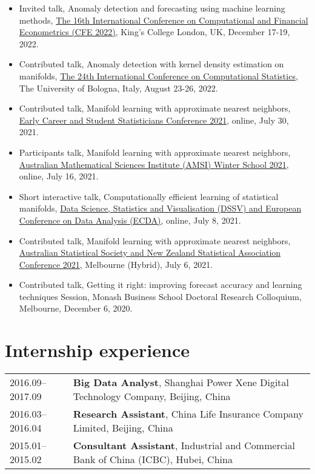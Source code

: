 \documentclass[10pt,a4paper,]{article}
\begin{document}
\begin{itemize}
\item
  Invited talk, Anomaly detection and forecasting using machine learning
  methods,
  \href{http://www.cfenetwork.org/CFE2022/index.php}{The 16th International Conference on Computational and Financial Econometrics (CFE 2022)},
  King's College London, UK, December 17-19, 2022.
\item
  Contributed talk, Anomaly detection with kernel density estimation on
  manifolds,
  \href{http://www.compstat2022.org/index.php}{The 24th International Conference on Computational Statistics},
  The University of Bologna, Italy, August 23-26, 2022.
\item
  Contributed talk, Manifold learning with approximate nearest
  neighbors,
  \href{http://ecssc2021.com.au/}{Early Career and Student Statisticians Conference 2021},
  online, July 30, 2021.
\item
  Participants talk, Manifold learning with approximate nearest
  neighbors,
  \href{https://ws.amsi.org.au/}{Australian Mathematical Sciences Institute (AMSI) Winter School 2021},
  online, July 16, 2021.
\item
  Short interactive talk, Computationally efficient learning of
  statistical manifolds,
  \href{https://iasc-isi.org/dssv-ecda2021/}{Data Science, Statistics and Visualisation (DSSV) and European Conference on Data Analysis (ECDA)},
  online, July 8, 2021.
\item
  Contributed talk, Manifold learning with approximate nearest
  neighbors,
  \href{https://anzsc2021.com.au/}{Australian Statistical Society and New Zealand Statistical Association Conference 2021},
  Melbourne (Hybrid), July 6, 2021.
\item
  Contributed talk, Getting it right: improving forecast accuracy and
  learning techniques Session, Monash Business School Doctoral Research
  Colloquium, Melbourne, December 6, 2020.
\end{itemize}

\section{Internship experience}\label{internship-experience}

\begin{tabular}{ll}
  2016.09--2017.09 & \textbf{Big Data Analyst}, Shanghai Power Xene Digital Technology Company, Beijing, China \\ 
  2016.03--2016.04 & \textbf{Research Assistant}, China Life Insurance Company Limited, Beijing, China \\ 
  2015.01--2015.02 & \textbf{Consultant Assistant}, Industrial and Commercial Bank of China (ICBC), Hubei, China \\ 
  \end{tabular}
\end{document}
